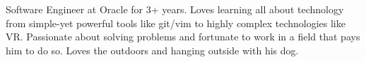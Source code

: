 

\begin{cvparagraph}

Software Engineer at Oracle for 3+ years. Loves learning all about technology from simple-yet powerful tools like git/vim to highly complex technologies like VR. Passionate about solving problems and fortunate to work in a field that pays him to do so. Loves the outdoors and hanging outside with his dog.
\end{cvparagraph}
